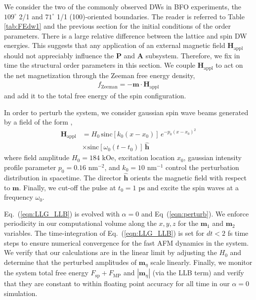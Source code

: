 \documentclass[%
 reprint,
superscriptaddress,
 amsmath,amssymb,
prb,
]{revtex4-1}
\begin{document}
%
We consider the two of the commonly observed DWs in BFO experiments, the $109^\circ$ 2/1 and $71^\circ$ 1/1 (100)-oriented boundaries\cite{Heron2014, Johann2012, Parsonet2022}.
%
The reader is referred to Table \ref{tab:FEdw1} and the previous section for the initial conditions of the order parameters.
%
There is a large relative difference between the lattice and spin DW energies.
%
This suggests that any application of an external magnetic field $\mathbf{H}_\mathrm{appl}$ should not appreciably influence the $\mathbf{P}$ and $\mathbf{A}$ subsystem.
%
Therefore, we fix in time the structural order parameters in this section.
%
We couple $\mathbf{H}_\mathrm{appl}$ to act on the net magnetization through the Zeeman free energy density,
%
\begin{equation}\label{eqn:Zeeman}
\begin{aligned}
    f_\mathrm{Zeeman} = -\mathbf{m}\cdot\mathbf{H}_\mathrm{appl}
\end{aligned}
\end{equation}
%
and add it to the total free energy of the spin configuration.
%



%
In order to perturb the system, we consider gaussian spin wave beams generated by a field of the form \cite{Gruszecki2015},
%
%
\begin{equation}\label{eqn:perturb}
\begin{aligned}
    \mathbf{H}_\mathrm{appl} &= H_0 \, \mathrm{sinc}[k_0 (x-x_0)] \, e^{-p_0(x-x_0)^2} \\ \nonumber
    &\times \mathrm{sinc}[\omega_0 (t-t_0)]\,\hat{\mathbf{h}}
\end{aligned}
\end{equation}
%
where field amplitude $H_0 = 184$ kOe, excitation location $x_0$, gaussian intensity profile parameter $p_0 = 0.16$ $\mathrm{nm}^{-2}$, and $k_0 = 10$ $\mathrm{nm}^{-1}$ control the perturbation distribution in spacetime.
%
The director $\hat{\mathbf{h}}$ orients the magnetic field with respect to $\mathbf{m}$.
%
Finally, we cut-off the pulse at $t_0 = 1$ ps and excite the spin waves at a frequency $\omega_0$. 
%

Eq.~(\ref{eqn:LLG_LLB}) is evolved with $\alpha = 0$ and Eq~(\ref{eqn:perturb}).
%
We enforce periodicity in our computational volume along the $x, y, z$ for the $\mathbf{m}_1$ and $\mathbf{m}_2$ variables.
%
The time-integration of Eq.~(\ref{eqn:LLG_LLB}) is set for $dt < 2$ fs time steps to ensure numerical convergence for the fast AFM dynamics in the system.
%
We verify that our calculations are in the linear limit by adjusting the $H_0$ and determine that the perturbed amplitudes of $\mathbf{m}_\eta$ scale linearly.
%
Finally, we monitor the system total free energy $F_\mathrm{sp} + F_\mathrm{MP}$ and $|\mathbf{m}_\eta|$ (via the LLB term) and verify that they are constant to within floating point accuracy for all time in our $\alpha = 0$ simulation.
%
\end{document}
